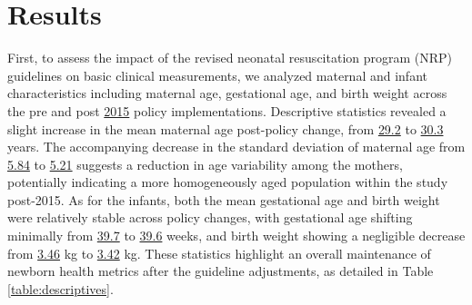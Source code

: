 \documentclass[11pt]{article}
\begin{document}
\section*{Results}
First, to assess the impact of the revised neonatal resuscitation program (NRP) guidelines on basic clinical measurements, we analyzed maternal and infant characteristics including maternal age, gestational age, and birth weight across the pre and post \hyperlink{S0a}{2015} policy implementations. Descriptive statistics revealed a slight increase in the mean maternal age post-policy change, from \hyperlink{A0b}{29.2} to \hyperlink{A1b}{30.3} years. The accompanying decrease in the standard deviation of maternal age from \hyperlink{A2b}{5.84} to \hyperlink{A3b}{5.21} suggests a reduction in age variability among the mothers, potentially indicating a more homogeneously aged population within the study post-2015. As for the infants, both the mean gestational age and birth weight were relatively stable across policy changes, with gestational age shifting minimally from \hyperlink{A4b}{39.7} to \hyperlink{A5b}{39.6} weeks, and birth weight showing a negligible decrease from \hyperlink{A8b}{3.46} kg to \hyperlink{A9b}{3.42} kg. These statistics highlight an overall maintenance of newborn health metrics after the guideline adjustments, as detailed in Table {}\ref{table:descriptives}.
\end{document}
